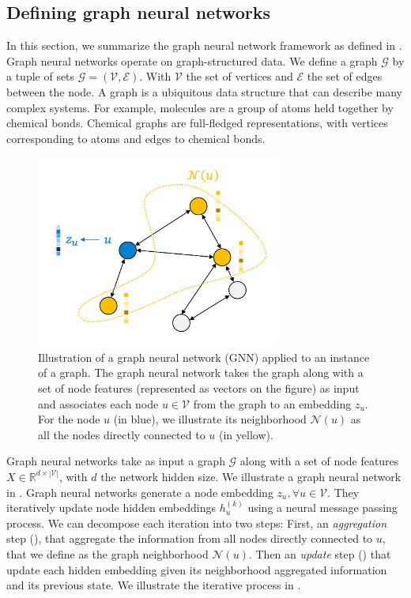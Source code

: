 \subsection{Defining graph neural networks}

In this section, we summarize the graph neural network framework as defined in \textcite{hamilton_2020}.
Graph neural networks operate on graph-structured data. We define a graph $\mathscr{G}$ by a tuple of sets $\mathscr{G} = (\mathcal{V}, \mathcal{E})$. With $\mathcal{V}$ the set of vertices and $\mathcal{E}$ the set of edges between the node. 
A graph is a ubiquitous data structure that can describe many complex systems. For example, molecules are a group of atoms held together by chemical bonds. Chemical graphs are full-fledged representations, with vertices corresponding to atoms and edges to chemical bonds.

\begin{figure}[!htb]
\begin{center}
\includegraphics[width=8cm]{images/graph-neihborhood_2.png}
\end{center}
\caption{Illustration of a graph neural network (GNN) applied to an instance of a graph. The graph neural network takes the graph along with a set of node features (represented as vectors on the figure) as input and associates each node $u \in \mathcal{V}$ from the graph to an embedding $z_u$. For the node $u$ (in blue), we illustrate its neighborhood $\mathcal{N}(u)$  as all the nodes directly connected to $u$ (in yellow).}
\end{figure}

Graph neural networks take as input a graph $\mathscr{G}$ along with a set of node features $X \in \mathbb{R}^{d \times |\mathcal{V}|}$, with $d$ the network hidden size. We illustrate a graph neural network in .
Graph neural networks generate a node embedding $z_u, \forall u \in \mathcal{V}$. They iteratively update node hidden embeddings $h_u^{(k)}$ using a neural message passing process. 
We can decompose each iteration into two steps: First, an \textit{aggregation} step (), that aggregate the information from all nodes directly connected to $u$, that we define as the graph neighborhood $\mathcal{N}(u)$. Then an \textit{update} step () that update each hidden embedding given its neighborhood aggregated information and its previous state. We illustrate the iterative process in . 

